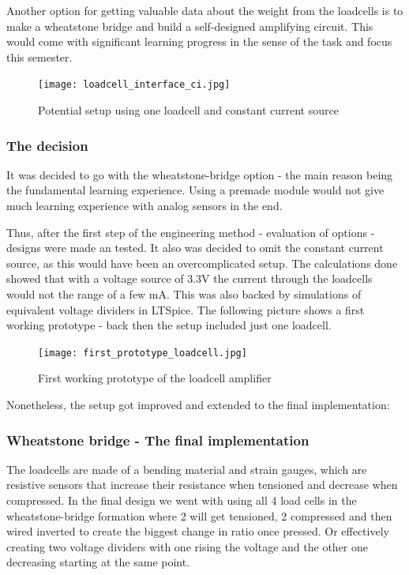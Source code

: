 \documentclass[../report.tex]{subfiles}
\begin{document}
Another option for getting valuable data about the weight from the loadcells
is to make a wheatstone bridge and build a self-designed amplifying circuit.
This would come with significant learning progress in the sense of the task and 
focus this semester.

\begin{figure}[H]
  \centering
  \texttt{[image: loadcell\_interface\_ci.jpg]}
  \caption{Potential setup using one loadcell and constant current source}
\end{figure} 

\subsubsection{The decision}
It was decided to go with the wheatstone-bridge option - the main reason being
the fundamental learning experience. Using a premade module would not give much 
learning experience with analog sensors in the end. 

\quad
Thus, after the first step of the engineering method - evaluation of options -
designs were made an tested.
It also was decided to omit the constant current source, as this would have been an 
overcomplicated setup. The calculations done showed that with a voltage source of 3.3V
the current through the loadcells would not the range of a few mA. This was also backed
by simulations of equivalent voltage dividers in LTSpice.
The following picture shows a first working prototype - back then the setup included just one loadcell. 
\begin{figure}[H]
  \centering
  \texttt{[image: first\_prototype\_loadcell.jpg]}
  \caption{First working prototype of the loadcell amplifier}
\end{figure}

Nonetheless, the setup got improved 
and extended to the final implementation:
\subsubsection{Wheatstone bridge - The final implementation}

The loadcells are made of a bending material and strain gauges, which are resistive
sensors that increase their resistance when tensioned and decrease when compressed.
In the final design we went with using all 4 load cells in the wheatstone-bridge formation
where 2 will get tensioned, 2 compressed and then wired inverted to create the biggest change
in ratio once pressed. Or effectively creating two voltage dividers with one rising the voltage
and the other one decreasing starting at the same point.
\end{document}
